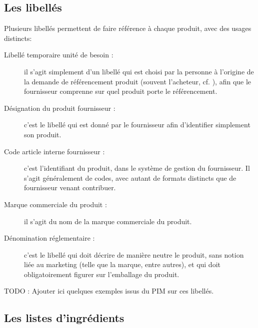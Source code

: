             \subsection{Les libellés}

            Plusieurs libellés permettent de faire référence à chaque produit, avec des usages distincts:
            \begin{description}
                \item[Libellé temporaire unité de besoin :] il s'agit simplement d'un libellé qui est choisi par la personne à l'origine de la demande de référencement produit (souvent l'acheteur, cf. ), afin que le fournisseur comprenne sur quel produit porte le référencement.
                \item[Désignation du produit fournisseur :] c'est le libellé qui est donné par le fournisseur afin d'identifier simplement son produit.
                \item[Code article interne fournisseur :] c'est l'identifiant du produit, dans le système de gestion du fournisseur. Il s'agit généralement de codes, avec autant de formats distincts que de fournisseur venant contribuer.
                \item[Marque commerciale du produit :] il s'agit du nom de la marque commerciale du produit. 
                \item[Dénomination réglementaire :] c'est le libellé qui doit décrire de manière neutre le produit, sans notion liée au marketing (telle que la marque, entre autres), et qui doit obligatoirement figurer sur l'emballage du produit.
            \end{description}

            TODO : Ajouter ici quelques exemples issus du PIM sur ces libellés.

            \subsection{Les listes d'ingrédients}
            \label{listes_ingredients}

